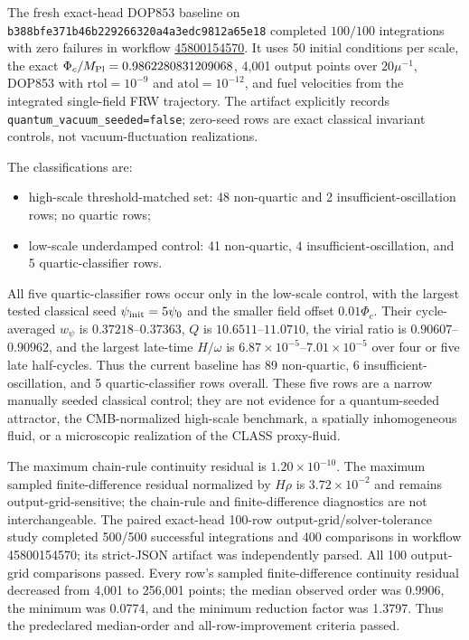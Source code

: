 \documentclass[epj]{svjour}
\begin{document}
The fresh exact-head DOP853 baseline on
\texttt{b388bfe371b46b229266320a4a3edc9812a65e18} completed
$100/100$ integrations with zero failures in workflow
\href{https://github.com/arreasonn-jpg/PTUM-Phase-Transition-Universes-Model-/actions/runs/45800154570}{45800154570}.
It uses 50 initial conditions per scale, the exact
$\Phi_c/M_{\rm Pl}=0.9862280831209068$, 4,001 output points over
$20\mu^{-1}$, DOP853 with
$\mathrm{rtol}=10^{-9}$ and $\mathrm{atol}=10^{-12}$, and fuel
velocities from the integrated single-field FRW trajectory.
The artifact explicitly records
\texttt{quantum\_vacuum\_seeded=false}; zero-seed rows are exact
classical invariant controls, not vacuum-fluctuation realizations.

The classifications are:
\begin{itemize}
\item high-scale threshold-matched set: 48 non-quartic and 2
      insufficient-oscillation rows; no quartic rows;
\item low-scale underdamped control: 41 non-quartic, 4
      insufficient-oscillation, and 5 quartic-classifier rows.
\end{itemize}
All five quartic-classifier rows occur only in the low-scale control,
with the largest tested classical seed $\psi_{\rm init}=5\psi_0$
and the smaller field offset $0.01\Phi_c$. Their cycle-averaged
$w_\psi$ is $0.37218$--$0.37363$, $Q$ is
$10.6511$--$11.0710$, the virial ratio is
$0.90607$--$0.90962$, and the largest late-time $H/\omega$ is
$6.87\times10^{-5}$--$7.01\times10^{-5}$ over four or five late
half-cycles. Thus the current baseline has 89 non-quartic, 6
insufficient-oscillation, and 5 quartic-classifier rows overall.
These five rows are a narrow manually seeded classical control;
they are not evidence for a quantum-seeded attractor, the
CMB-normalized high-scale benchmark, a spatially inhomogeneous
fluid, or a microscopic realization of the CLASS proxy-fluid.

The maximum chain-rule continuity residual is
$1.20\times10^{-10}$. The maximum sampled finite-difference residual
normalized by $H\rho$ is $3.72\times10^{-2}$ and remains
output-grid-sensitive; the chain-rule and finite-difference
diagnostics are not interchangeable. The paired exact-head 100-row output-grid/solver-tolerance study
completed 500/500 successful integrations and 400 comparisons in
workflow 45800154570; its strict-JSON artifact was independently
parsed. All 100 output-grid comparisons passed. Every row's sampled
finite-difference continuity residual decreased from 4,001 to
256,001 points; the median observed order was 0.9906, the minimum
was 0.0774, and the minimum reduction factor was 1.3797. Thus the
predeclared median-order and all-row-improvement criteria passed.
\end{document}
